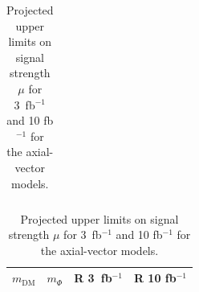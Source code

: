 \begin{table}[h!]
\begin{minipage}{.45\textwidth}
{\begin{tabular}{llll}
\end{tabular}
\caption{Projected upper limits on signal strength $\mu$ for 3~fb$^{-1}$ and 10 fb$^{-1}$ for the axial-vector models. \label{tab:dm_A_R_values}}
}\end{minipage}%
\hfill
\begin{minipage}{.45\textwidth}{
\begin{tabular}{llll}
\hline                      
 $m_\textrm{DM}$ & $m_\Phi$  & R 3~fb$^{-1}$ & R 10 fb$^{-1}$ \\ \hline



\end{tabular}}
\end{minipage}
\end{table}
